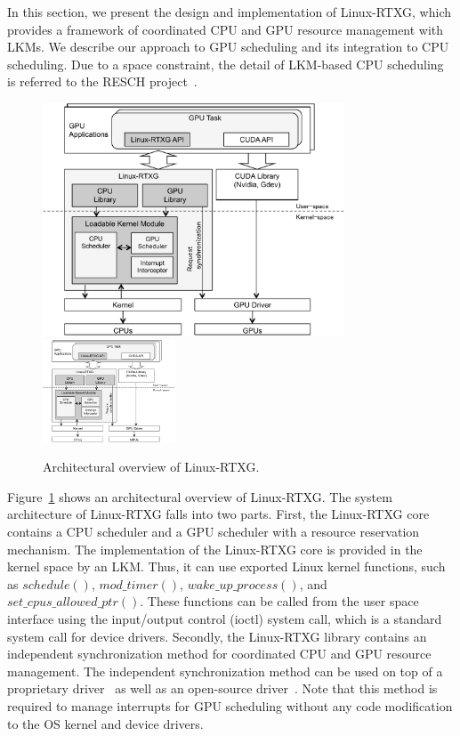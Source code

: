 \label{sec:design_imple}
In this section, we present the design and implementation of Linux-RTXG,
which provides a framework of coordinated CPU and GPU resource
management with LKMs.
We describe our approach to GPU scheduling and its integration to CPU
scheduling.
Due to a space constraint, the detail of LKM-based CPU scheduling is
referred to the RESCH project~\cite{kato2009loadable, asberg2012exsched}.

\begin{figure}[t]
\begin{center}
\ifthesis
\includegraphics[width=0.8\textwidth]{img/overview.pdf}
\else
\includegraphics[width=0.35\textwidth]{img/overview.pdf}
\fi
\caption{Architectural overview of Linux-RTXG.}
\label{fig:overview}
\end{center}
\end{figure}

Figure~\ref{fig:overview} shows an architectural overview of
Linux-RTXG.
The system architecture of Linux-RTXG falls into two parts.
First, the Linux-RTXG core contains a CPU scheduler and a GPU scheduler
with a resource reservation mechanism.
The implementation of the Linux-RTXG core is provided in the kernel
space by an LKM.
Thus, it can use exported Linux kernel functions, such as $schedule()$,
$mod\_timer()$, $wake\_up\_process()$, and $set\_cpus\_allowed\_ptr()$.
These functions can be called from the user space interface using the
input/output control (ioctl) system call, which is a standard system
call for device drivers.
Secondly, the Linux-RTXG library contains an independent synchronization
method for coordinated CPU and GPU resource management.
The independent synchronization method can be used on top of a
proprietary driver~\cite{nvidia:cuda_zone} as well as an open-source
driver~\cite{nouveau}.
Note that this method is required to manage interrupts for GPU
scheduling without any code modification to the OS kernel and device
drivers.

